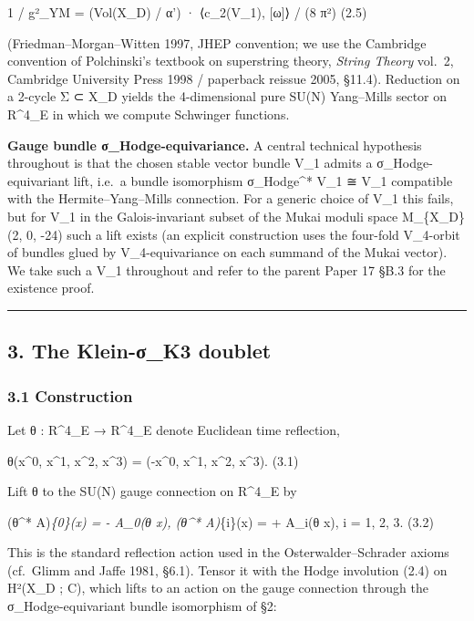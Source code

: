 \documentclass[
 11pt,
 a4paper,
]{article}
\begin{document}
1 / g²\_YM = (Vol(X\_D) / α') · ⟨c\_2(V\_1), {[}ω{]}⟩ / (8 π²) (2.5)

(Friedman--Morgan--Witten 1997, JHEP convention; we use the Cambridge convention of Polchinski's textbook on superstring theory, \emph{String Theory} vol.~2, Cambridge University Press 1998 / paperback reissue 2005, §11.4). Reduction on a 2-cycle Σ ⊂ X\_D yields the 4-dimensional pure SU(N) Yang--Mills sector on R\^{}4\_E in which we compute Schwinger functions.

\textbf{Gauge bundle σ\_Hodge-equivariance.} A central technical hypothesis throughout is that the chosen stable vector bundle V\_1 admits a σ\_Hodge-equivariant lift, i.e.~a bundle isomorphism σ\_Hodge\^{}* V\_1 ≅ V\_1 compatible with the Hermite--Yang--Mills connection. For a generic choice of V\_1 this fails, but for V\_1 in the Galois-invariant subset of the Mukai moduli space M\_\{X\_D\}(2, 0, -24) such a lift exists (an explicit construction uses the four-fold V\_4-orbit of bundles glued by V\_4-equivariance on each summand of the Mukai vector). We take such a V\_1 throughout and refer to the parent Paper 17 §B.3 for the existence proof.

\begin{center}\rule{0.5\linewidth}{0.5pt}\end{center}

\hypertarget{the-klein-ux3c3_k3-doublet}{%
\subsection{3. The Klein-σ\_K3 doublet}\label{the-klein-ux3c3_k3-doublet}}

\hypertarget{construction}{%
\subsubsection{3.1 Construction}\label{construction}}

Let θ : R\^{}4\_E → R\^{}4\_E denote Euclidean time reflection,

θ(x\^{}0, x\^{}1, x\^{}2, x\^{}3) = (-x\^{}0, x\^{}1, x\^{}2, x\^{}3). (3.1)

Lift θ to the SU(N) gauge connection on R\^{}4\_E by

(θ\^{}* A)\emph{\{0\}(x) = - A\_0(θ x), (θ\^{}* A)}\{i\}(x) = + A\_i(θ x), i = 1, 2, 3. (3.2)

This is the standard reflection action used in the Osterwalder--Schrader axioms (cf.~Glimm and Jaffe 1981, §6.1). Tensor it with the Hodge involution (2.4) on H²(X\_D ; C), which lifts to an action on the gauge connection through the σ\_Hodge-equivariant bundle isomorphism of §2:
\end{document}
